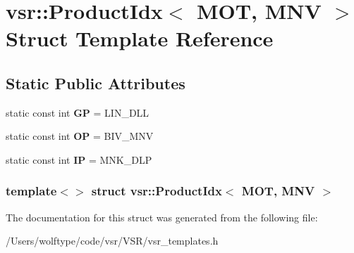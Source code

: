 \hypertarget{structvsr_1_1_product_idx_3_01_m_o_t_00_01_m_n_v_01_4}{\section{vsr\-:\-:Product\-Idx$<$ M\-O\-T, M\-N\-V $>$ Struct Template Reference}
\label{structvsr_1_1_product_idx_3_01_m_o_t_00_01_m_n_v_01_4}
}
\subsection*{Static Public Attributes}
\begin{DoxyCompactItemize}
\item 
\hypertarget{structvsr_1_1_product_idx_3_01_m_o_t_00_01_m_n_v_01_4_a4c2f56ccacf23af67d1afde6605b8e0a}{static const int {\bfseries G\-P} = L\-I\-N\-\_\-\-D\-L\-L}\label{structvsr_1_1_product_idx_3_01_m_o_t_00_01_m_n_v_01_4_a4c2f56ccacf23af67d1afde6605b8e0a}

\item 
\hypertarget{structvsr_1_1_product_idx_3_01_m_o_t_00_01_m_n_v_01_4_a6a5acf16866098ec1401dde66ae9a5cc}{static const int {\bfseries O\-P} = B\-I\-V\-\_\-\-M\-N\-V}\label{structvsr_1_1_product_idx_3_01_m_o_t_00_01_m_n_v_01_4_a6a5acf16866098ec1401dde66ae9a5cc}

\item 
\hypertarget{structvsr_1_1_product_idx_3_01_m_o_t_00_01_m_n_v_01_4_a3618f0c26b220e5d2d40dd25a5ee110a}{static const int {\bfseries I\-P} = M\-N\-K\-\_\-\-D\-L\-P}\label{structvsr_1_1_product_idx_3_01_m_o_t_00_01_m_n_v_01_4_a3618f0c26b220e5d2d40dd25a5ee110a}

\end{DoxyCompactItemize}
\subsubsection*{template$<$$>$ struct vsr\-::\-Product\-Idx$<$ M\-O\-T, M\-N\-V $>$}



The documentation for this struct was generated from the following file\-:\begin{DoxyCompactItemize}
\item 
/\-Users/wolftype/code/vsr/\-V\-S\-R/vsr\-\_\-templates.\-h\end{DoxyCompactItemize}
